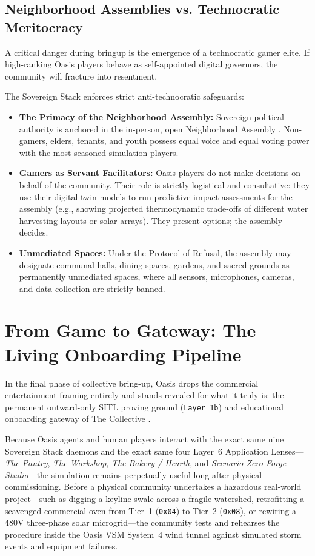 \subsection{Neighborhood Assemblies vs. Technocratic Meritocracy}

A critical danger during bringup is the emergence of a technocratic gamer elite. If high-ranking Oasis players behave as self-appointed digital governors, the community will fracture into resentment.

The Sovereign Stack enforces strict anti-technocratic safeguards:
\begin{itemize}
    \item \textbf{The Primacy of the Neighborhood Assembly:} Sovereign political authority is anchored in the in-person, open Neighborhood Assembly \parencite{bookchin1982}. Non-gamers, elders, tenants, and youth possess equal voice and equal voting power with the most seasoned simulation players.
    \item \textbf{Gamers as Servant Facilitators:} Oasis players do not make decisions on behalf of the community. Their role is strictly logistical and consultative: they use their digital twin models to run predictive impact assessments for the assembly (e.g., showing projected thermodynamic trade-offs of different water harvesting layouts or solar arrays). They present options; the assembly decides.
    \item \textbf{Unmediated Spaces:} Under the Protocol of Refusal, the assembly may designate communal halls, dining spaces, gardens, and sacred grounds as permanently unmediated spaces, where all sensors, microphones, cameras, and data collection are strictly banned.
\end{itemize}


\section{From Game to Gateway: The Living Onboarding Pipeline}

In the final phase of collective bring-up, Oasis drops the commercial entertainment framing entirely and stands revealed for what it truly is: the permanent outward-only SITL proving ground (\texttt{Layer~1b}) and educational onboarding gateway of The Collective \parencite{girard2013}.

Because Oasis agents and human players interact with the exact same nine Sovereign Stack daemons and the exact same four Layer~6 Application Lenses---\textit{The Pantry}, \textit{The Workshop}, \textit{The Bakery / Hearth}, and \textit{Scenario Zero Forge Studio}---the simulation remains perpetually useful long after physical commissioning. Before a physical community undertakes a hazardous real-world project---such as digging a keyline swale across a fragile watershed, retrofitting a scavenged commercial oven from Tier~1 (\texttt{0x04}) to Tier~2 (\texttt{0x08}), or rewiring a 480V three-phase solar microgrid---the community tests and rehearses the procedure inside the Oasis VSM System~4 wind tunnel against simulated storm events and equipment failures.

